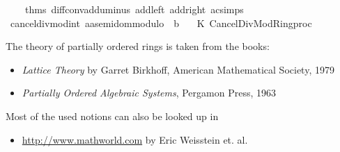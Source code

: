 \begin{isabellebody}
\ \ \ \ {\isacharat}{\kern0pt}{\isacharbraceleft}{\kern0pt}thms\ diff{\isacharunderscore}{\kern0pt}conv{\isacharunderscore}{\kern0pt}add{\isacharunderscore}{\kern0pt}uminus\ add{\isacharunderscore}{\kern0pt}{}{\isacharunderscore}{\kern0pt}left\ add{\isacharunderscore}{\kern0pt}{}{\isacharunderscore}{\kern0pt}right\ ac{\isacharunderscore}{\kern0pt}simps{\isacharbraceright}{\kern0pt}{\isacharparenright}{\kern0pt}\isanewline
{\isacharparenright}{\kern0pt}\isanewline
{\isacartoucheclose}\isanewline
\isanewline
{}\isamarkupfalse%
\ cancel{\isacharunderscore}{\kern0pt}div{\isacharunderscore}{\kern0pt}mod{\isacharunderscore}{\kern0pt}int\ {\isacharparenleft}{\kern0pt}{\isachardoublequoteopen}{\isacharparenleft}{\kern0pt}a{\isacharcolon}{\kern0pt}{\isacharcolon}{\kern0pt}{\isacharprime}{\kern0pt}a{\isacharcolon}{\kern0pt}{\isacharcolon}{\kern0pt}semidom{\isacharunderscore}{\kern0pt}modulo{\isacharparenright}{\kern0pt}\ {\isacharplus}{\kern0pt}\ b{\isachardoublequoteclose}{\isacharparenright}{\kern0pt}\ {\isacharequal}{\kern0pt}\isanewline
\ \ {\isacartoucheopen}K\ Cancel{\isacharunderscore}{\kern0pt}Div{\isacharunderscore}{\kern0pt}Mod{\isacharunderscore}{\kern0pt}Ring{\isachardot}{\kern0pt}proc{\isacartoucheclose}%
\endisatagML
{\isafoldML}%
%
\isadelimML
%
\endisadelimML
%
\isadelimdocument
%
\endisadelimdocument
%
\isatagdocument
%
\isamarkuptrue%
%
\endisatagdocument
{\isafolddocument}%
%
\isadelimdocument
%
\endisadelimdocument
%
\begin{isamarkuptext}%
The theory of partially ordered rings is taken from the books:

%
\begin{itemize}%
\item \emph{Lattice Theory} by Garret Birkhoff, American Mathematical Society, 1979

\item \emph{Partially Ordered Algebraic Systems}, Pergamon Press, 1963%
\end{itemize}

Most of the used notions can also be looked up in

%
\begin{itemize}%
\item \url{http://www.mathworld.com} by Eric Weisstein et. al.


\end{itemize}
\end{isamarkuptext}
\end{isabellebody}
